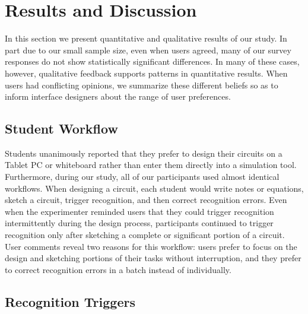 \documentclass{elsart}
\begin{document}
\section{Results and Discussion}

In this section we present quantitative and qualitative results of our
study.  In part due to our small sample size, even when users agreed,
many of our survey responses do not show statistically significant
differences.  In many of these cases, however, qualitative feedback
supports patterns in quantitative results.  When users had conflicting
opinions, we summarize these different beliefs so as to inform
interface designers about the range of user preferences.

\subsection{Student Workflow}

Students unanimously reported that they prefer to design their
circuits on a Tablet PC or whiteboard rather than enter them directly
into a simulation tool.  Furthermore, during our study, all of our
participants used almost identical workflows.  When designing a
circuit, each student would write notes or equations, sketch a
circuit, trigger recognition, and then correct recognition errors.
Even when the experimenter reminded users that they could trigger
recognition intermittently during the design process, participants
continued to trigger recognition only after sketching a complete or
significant portion of a circuit.  User comments reveal two reasons
for this workflow: users prefer to focus on the design and
sketching portions of their tasks without interruption, and they
prefer to correct recognition errors in a batch instead of
individually.  



\subsection{Recognition Triggers}
\end{document}
